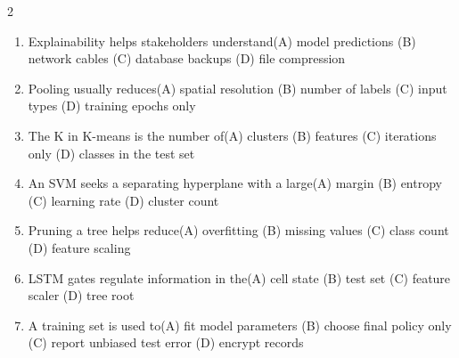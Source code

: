 \documentclass[a4paper]{article}
\begin{document}
\begin{multicols*}{2}
\begin{enumerate}[resume]
\item Explainability helps stakeholders understand\newline\hspace*{0.6em}(A) model predictions \quad (B) network cables \newline\hspace*{0.6em}(C) database backups \quad (D) file compression
\item Pooling usually reduces\newline\hspace*{0.6em}(A) spatial resolution \quad (B) number of labels \newline\hspace*{0.6em}(C) input types \quad (D) training epochs only
\item The K in K-means is the number of\newline\hspace*{0.6em}(A) clusters \quad (B) features \newline\hspace*{0.6em}(C) iterations only \quad (D) classes in the test set
\item An SVM seeks a separating hyperplane with a large\newline\hspace*{0.6em}(A) margin \quad (B) entropy \newline\hspace*{0.6em}(C) learning rate \quad (D) cluster count
\item Pruning a tree helps reduce\newline\hspace*{0.6em}(A) overfitting \quad (B) missing values \newline\hspace*{0.6em}(C) class count \quad (D) feature scaling
\item LSTM gates regulate information in the\newline\hspace*{0.6em}(A) cell state \quad (B) test set \newline\hspace*{0.6em}(C) feature scaler \quad (D) tree root
\item A training set is used to\newline\hspace*{0.6em}(A) fit model parameters \quad (B) choose final policy only \newline\hspace*{0.6em}(C) report unbiased test error \quad (D) encrypt records

\end{enumerate}
\end{multicols*}
\end{document}
